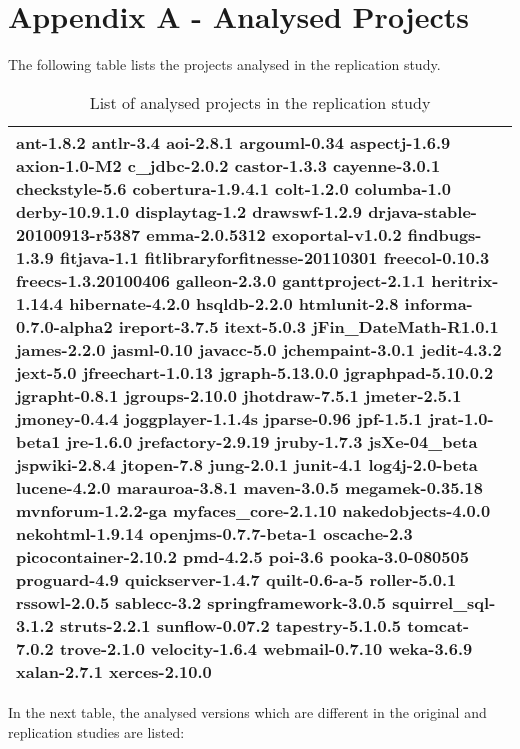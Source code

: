 \documentclass{uvamscse}
\begin{document}
\newpage
\appendix
\section{\\Appendix A - Analysed Projects} \label{App:AppendixA}
The following table lists the projects analysed in the replication study.
\begin{table} [h!]
\begin{flushleft}
\begin{tabular}[c]{ |p{150mm} |}
  \hline
  ant-1.8.2   antlr-3.4   aoi-2.8.1   argouml-0.34   aspectj-1.6.9  axion-1.0-M2   c\_jdbc-2.0.2   castor-1.3.3   cayenne-3.0.1    checkstyle-5.6   cobertura-1.9.4.1   colt-1.2.0   columba-1.0   derby-10.9.1.0   displaytag-1.2   drawswf-1.2.9 drjava-stable-20100913-r5387   emma-2.0.5312   exoportal-v1.0.2   findbugs-1.3.9   fitjava-1.1   fitlibraryforfitnesse-20110301 freecol-0.10.3   freecs-1.3.20100406   galleon-2.3.0   ganttproject-2.1.1    heritrix-1.14.4   hibernate-4.2.0    hsqldb-2.2.0   htmlunit-2.8   informa-0.7.0-alpha2   ireport-3.7.5   itext-5.0.3   jFin\_DateMath-R1.0.1   james-2.2.0   jasml-0.10   javacc-5.0   jchempaint-3.0.1   jedit-4.3.2   jext-5.0   jfreechart-1.0.13   jgraph-5.13.0.0   jgraphpad-5.10.0.2   jgrapht-0.8.1   jgroups-2.10.0   jhotdraw-7.5.1   jmeter-2.5.1   jmoney-0.4.4   joggplayer-1.1.4s   jparse-0.96   jpf-1.5.1  jrat-1.0-beta1   jre-1.6.0   jrefactory-2.9.19   jruby-1.7.3   jsXe-04\_beta   jspwiki-2.8.4   jtopen-7.8   jung-2.0.1    junit-4.1   log4j-2.0-beta   lucene-4.2.0   marauroa-3.8.1   maven-3.0.5   megamek-0.35.18   mvnforum-1.2.2-ga   myfaces\_core-2.1.10   nakedobjects-4.0.0   nekohtml-1.9.14   openjms-0.7.7-beta-1   oscache-2.3   picocontainer-2.10.2   pmd-4.2.5   poi-3.6   pooka-3.0-080505   proguard-4.9   quickserver-1.4.7   quilt-0.6-a-5   roller-5.0.1   rssowl-2.0.5   sablecc-3.2   springframework-3.0.5   squirrel\_sql-3.1.2   struts-2.2.1   sunflow-0.07.2   tapestry-5.1.0.5   tomcat-7.0.2   trove-2.1.0   velocity-1.6.4   webmail-0.7.10   weka-3.6.9   xalan-2.7.1   xerces-2.10.0
 \\
  \hline 
\end{tabular}
\end{flushleft}
\caption{List of analysed projects in the replication study}
\label{table:ListProjectsReplication}
\end{table}

In the next table, the analysed versions which are different in the original and replication studies are listed:
\end{document}
